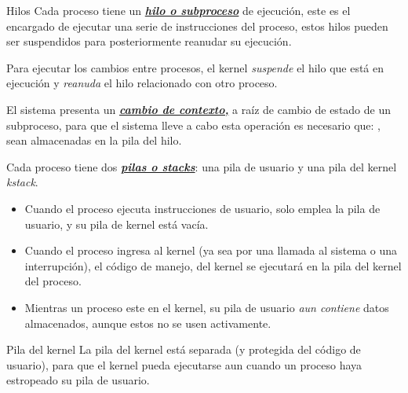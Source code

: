 \documentclass{libs/ufc_format}
\begin{document}
\begin{frame}{Hilos}
    Cada proceso tiene un \href{https://en.wikipedia.org/wiki/Thread_(computing)}{\textbf{\textit{hilo o subproceso}}} de ejecución, este es el encargado de ejecutar una serie de instrucciones del proceso, estos hilos pueden ser suspendidos para posteriormente reanudar su ejecución.
    
    \vspace{0.3cm}
    
    Para ejecutar los cambios entre procesos, el kernel \emph{suspende} el hilo que está en ejecución y \emph{reanuda} el hilo relacionado con otro proceso.
    
    \vspace{0.2cm}
    
    El sistema presenta un \href{https://en.wikipedia.org/wiki/Context_switch}{\textit{\textbf{cambio de contexto,}}} a raíz de cambio de estado de un subproceso, para que el sistema lleve a cabo esta operación es necesario que: , sean almacenadas en la pila del hilo.
\end{frame}
\begin{frame}{}
    Cada proceso tiene dos \href{https://en.wikipedia.org/wiki/Stack-based_memory_allocation}{\textit{\textbf{pilas o stacks}}}: una pila de usuario y una pila del kernel \textit{kstack}.
    
    \begin{itemize}
        \item Cuando el proceso ejecuta instrucciones de usuario, solo emplea la pila de usuario, y su pila de kernel está vacía. 
        \item Cuando el proceso ingresa al kernel (ya sea por una llamada al sistema o una interrupción), el código de manejo, del kernel se ejecutará en la pila del kernel del proceso.
        \item Mientras un proceso este en el kernel, su pila de usuario \emph{aun contiene} datos almacenados, aunque estos no se usen activamente.
    \end{itemize}

    \begin{block}{Pila del kernel}
        La pila del kernel está separada (y protegida del código de usuario), para que el kernel pueda ejecutarse aun cuando un proceso haya estropeado su pila de usuario. \cite{xv6_book}
    \end{block}
\end{frame}
\end{document}
